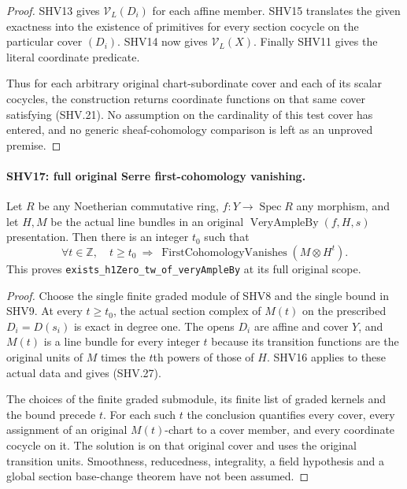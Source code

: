 \documentclass[11pt,a4paper]{article}
\numberwithin{equation}{section}
\theoremstyle{remark}\newtheorem{remark}[theorem]{Remark}
\begin{document}
\begin{proof}
SHV13 gives $\mathcal V_L(D_i)$ for each affine member.
SHV15 translates the given exactness into the existence of
primitives for every section cocycle on the particular
cover $(D_i)$.  SHV14 now gives $\mathcal V_L(X)$.
Finally SHV11 gives the literal coordinate predicate.

Thus for each arbitrary original chart-subordinate cover
and each of its scalar cocycles, the construction returns
coordinate functions on that same cover satisfying (SHV.21).
No assumption on the cardinality of this test cover has
entered, and no generic sheaf-cohomology comparison is left
as an unproved premise.
\end{proof}

\paragraph{SHV17: full original Serre first-cohomology vanishing.}
\label{claim:SHV17}
Let $R$ be any Noetherian commutative ring,
$f:Y\to\operatorname{Spec}R$ any morphism, and let
$H,M$ be the actual line bundles in an original
$\operatorname{VeryAmpleBy}(f,H,s)$ presentation.
Then there is an integer $t_0$ such that
\[
 \forall t\in\mathbb Z,\quad t\ge t_0
   \ \Longrightarrow\
       \operatorname{FirstCohomologyVanishes}(M\otimes H^t).
                                                        \tag{SHV.27}
\]
This proves \texttt{exists\_\allowbreak h1Zero\_\allowbreak tw\_\allowbreak of\_\allowbreak very\allowbreak Ample\allowbreak By}
at its full original scope.

\begin{proof}
Choose the single finite graded module of SHV8 and the single
bound in SHV9.  At every $t\ge t_0$, the actual section complex
of $M(t)$ on the prescribed $D_i=D(s_i)$ is exact in degree one.
The opens $D_i$ are affine and cover $Y$, and $M(t)$ is a line
bundle for every integer $t$ because its transition functions
are the original units of $M$ times the $t$th powers of those
of $H$.  SHV16 applies to these actual data and gives (SHV.27).

The choices of the finite graded submodule, its finite list of
graded kernels and the bound precede $t$.  For each such $t$
the conclusion quantifies every cover, every assignment of an
original $M(t)$-chart to a cover member, and every coordinate
cocycle on it.  The solution is on that original cover and
uses the original transition units.  Smoothness, reducedness,
integrality, a field hypothesis and a global section
base-change theorem have not been assumed.
\end{proof}
\end{document}
